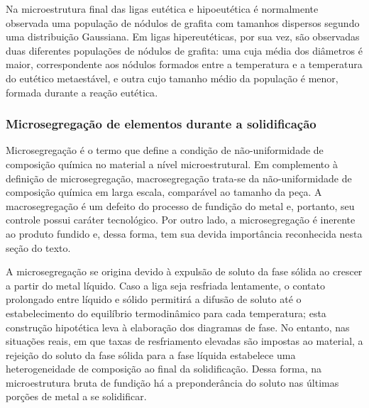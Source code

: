 Na microestrutura final das ligas eutética e hipoeutética é normalmente observada uma população de nódulos de grafita com tamanhos dispersos segundo uma distribuição Gaussiana. Em ligas hipereutéticas, por sua vez, são observadas duas diferentes populações de nódulos de grafita: uma cuja média dos diâmetros é maior, correspondente aos nódulos formados entre a temperatura  e a temperatura do eutético metaestável, e outra cujo tamanho médio da população é menor, formada durante a reação eutética\cite{Santos1991}. %

\subsubsection{Microsegrega\c{c}\~{a}o de elementos durante a solidifica\c{c}\~{a}o}

Microsegregação é o termo que define a condição de não-uniformidade de composição química no material a nível microestrutural. Em complemento à definição de microsegregação, macrosegregação trata-se da não-uniformidade de composição química em larga escala, comparável ao tamanho da peça. A macrosegregação é um defeito do processo de fundição do metal e, portanto, seu controle possui caráter tecnológico. Por outro lado, a microsegregação é inerente ao produto fundido e, dessa forma, tem sua devida importância reconhecida nesta seção do texto.

A microsegregação se origina devido à expulsão de soluto da fase sólida ao crescer a partir do metal líquido. Caso a liga seja resfriada lentamente, o contato prolongado entre líquido e sólido permitirá a difusão de soluto até o estabelecimento do equilíbrio termodinâmico para cada temperatura; esta construção hipotética leva à elaboração dos diagramas de fase. No entanto, nas situações reais, em que taxas de resfriamento elevadas são impostas ao material, a rejeição do soluto da fase sólida para a fase líquida estabelece uma heterogeneidade de composição ao final da solidificação. Dessa forma, na microestrutura bruta de fundição há a preponderância do soluto nas últimas porções de metal a se solidificar.

